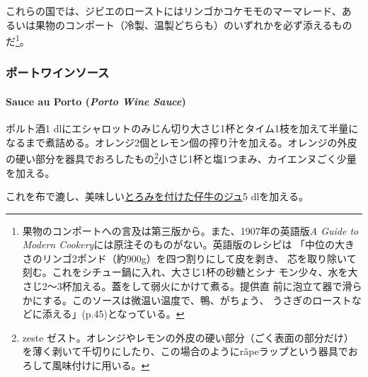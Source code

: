 \begin{recette}
これらの国では、ジビエのローストにはリンゴかコケモモのマーマレード、あ
るいは果物のコンポート（冷製、温製どちらも）のいずれかを必ず添えるもの
だ\footnote{果物のコンポートへの言及は第三版から。また、1907年の英語版\emph{A
  Guide to Modern Cookery}には原注そのものがない。英語版のレシピは
  「中位の大きさのリンゴ2ポンド（約900g）を四つ割りにして皮を剥き、
  芯を取り除いて刻む。これをシチュー鍋に入れ、大さじ1杯の砂糖とシナ
  モン少々、水を大さじ2〜3杯加える。蓋をして弱火にかけて煮る。提供直
  前に泡立て器で滑らかにする。このソースは微温い温度で、鴨、がちょう、
  うさぎのローストなどに添える」(p.45)となっている。}。

\maeaki

\hypertarget{ux30ddux30fcux30c8ux30efux30a4ux30f3ux30bdux30fcux30b9}{%
\subsubsection{ポートワインソース}\label{ux30ddux30fcux30c8ux30efux30a4ux30f3ux30bdux30fcux30b9}}

\hypertarget{porto-wine-sauce}{%
\paragraph{\texorpdfstring{Sauce au Porto (\emph{Porto Wine
Sauce})}{Sauce au Porto (Porto Wine Sauce)}}\label{porto-wine-sauce}}


ポルト酒1\undemi{}
dlにエシャロットのみじん切り大さじ1杯とタイム1枝を加えて半量になるまで煮詰める。オレンジ2個とレモン\undemi{}個の搾り汁を加える。オレンジの外皮の硬い部分を器具でおろしたもの\footnote{zeste
  ゼスト。オレンジやレモンの外皮の硬い部分（ごく表面の部分だけ）を薄く剥いて千切りにしたり、この場合のようにrâpeラップという器具でおろして風味付けに用いる。}小さじ1杯と塩1つまみ、カイエンヌごく少量を加える。

これを布で漉し、美味しい\protect\hyperlink{jus-de-veau-lie}{とろみを付けた仔牛のジュ}5
dlを加える。


\end{recette}

